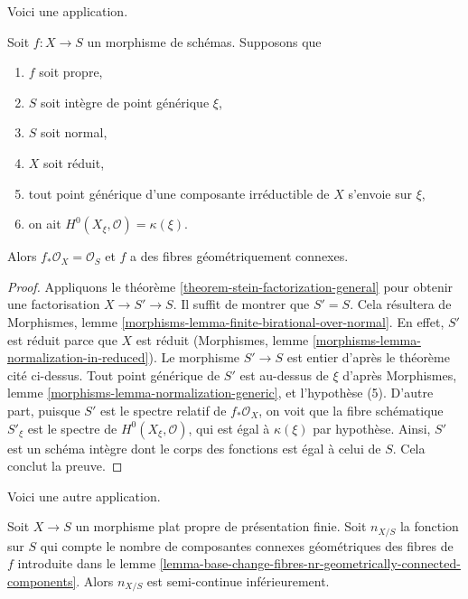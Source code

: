 \noindent
Voici une application.

\begin{lemma}
\label{lemma-geometrically-connected-fibres-towards-normal}
Soit $f : X \to S$ un morphisme de schémas. Supposons que
\begin{enumerate}
\item $f$ soit propre,
\item $S$ soit intègre de point générique $\xi$,
\item $S$ soit normal,
\item $X$ soit réduit,
\item tout point générique d'une composante irréductible de $X$ s'envoie sur $\xi$,
\item on ait $H^0(X_\xi, \mathcal{O}) = \kappa(\xi)$.
\end{enumerate}
Alors $f_*\mathcal{O}_X = \mathcal{O}_S$ et $f$
a des fibres géométriquement connexes.
\end{lemma}

\begin{proof}
Appliquons le théorème \ref{theorem-stein-factorization-general} pour obtenir une
factorisation $X \to S' \to S$. Il suffit de montrer que $S' = S$.
Cela résultera de Morphismes, lemme
\ref{morphisms-lemma-finite-birational-over-normal}.
En effet, $S'$ est réduit parce que $X$ est réduit
(Morphismes, lemme \ref{morphisms-lemma-normalization-in-reduced}).
Le morphisme $S' \to S$ est entier d'après le théorème cité ci-dessus.
Tout point générique de $S'$ est au-dessus de $\xi$ d'après
Morphismes, lemme \ref{morphisms-lemma-normalization-generic},
et l'hypothèse (5). D'autre part, puisque $S'$ est le spectre relatif
de $f_*\mathcal{O}_X$, on voit que la fibre schématique
$S'_\xi$ est le spectre de $H^0(X_\xi, \mathcal{O})$, qui est
égal à $\kappa(\xi)$ par hypothèse. Ainsi, $S'$ est un schéma
intègre dont le corps des fonctions est égal à celui de $S$.
Cela conclut la preuve.
\end{proof}

\noindent
Voici une autre application.

\begin{lemma}
\label{lemma-proper-flat-nr-geom-conn-comps-lower-semicontinuous}
Soit $X \to S$ un morphisme plat propre de présentation finie. Soit
$n_{X/S}$ la fonction sur $S$ qui compte le nombre de composantes
connexes géométriques des fibres de $f$ introduite dans le
lemme \ref{lemma-base-change-fibres-nr-geometrically-connected-components}.
Alors $n_{X/S}$ est semi-continue inférieurement.
\end{lemma}

